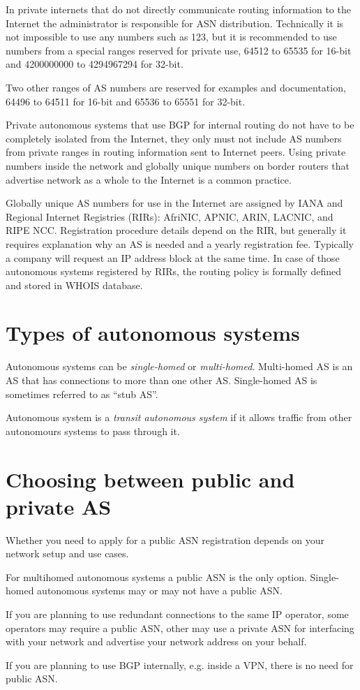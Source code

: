 In private internets that do not directly communicate routing information to the Internet the administrator is
responsible for ASN distribution. Technically it is not impossible to use any numbers such as 123,
but it is recommended to use numbers from a special ranges reserved for private use, 64512 to 65535 for
16-bit\cite{rfc1930} and 4200000000 to 4294967294 for 32-bit\cite{rfc6996}.

Two other ranges of AS numbers are reserved for examples and documentation, 64496 to 64511 for 16-bit and
65536 to 65551 for 32-bit\cite{rfc5398}.

Private autonomous systems that use BGP for internal routing do not have to be completely isolated from the Internet,
they only must not include AS numbers from private ranges in routing information sent to Internet peers. Using private
numbers inside the network and globally unique numbers on border routers that advertise network as a whole to the Internet
is a common practice.

Globally unique AS numbers for use in the Internet are assigned by IANA and Regional Internet Registries (RIRs): AfriNIC, APNIC,
ARIN, LACNIC, and RIPE NCC. Registration procedure details depend on the RIR, but generally it requires explanation why
an AS is needed and a yearly registration fee. Typically a company will request an IP address block at the same time.
In case of those autonomous systems registered by RIRs, the routing policy is formally defined and stored in WHOIS database.

\section{Types of autonomous systems}

Autonomous systems can be \emph{single-homed} or \emph{multi-homed}. Multi-homed AS is an AS that has connections to more than
one other AS. Single-homed AS is sometimes referred to as ``stub AS''.

Autonomous system is a \emph{transit autonomous system} if it allows traffic from other autonomours systems to pass through it.

\section{Choosing between public and private AS}

Whether you need to apply for a public ASN registration depends on your network setup and use cases.

For multihomed autonomous systems a public ASN is the only option. Single-homed autonomous systems may or may not
have a public ASN.

If you are planning to use redundant connections to the same IP operator, some operators may require a public ASN,
other may use a private ASN for interfacing with your network and advertise your network address on your behalf.

If you are planning to use BGP internally, e.g. inside a VPN, there is no need for public ASN.
